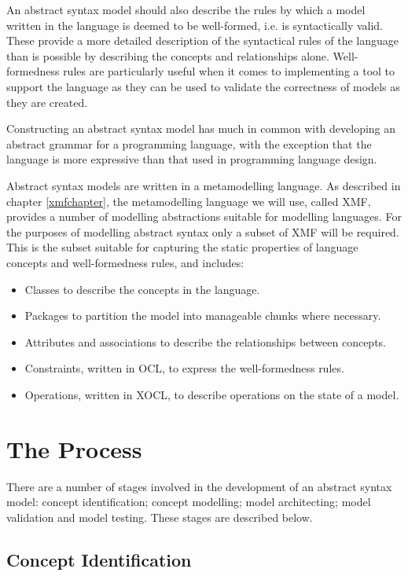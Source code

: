 An abstract syntax model should also describe  the rules by which
a model written in the language is deemed to be well-formed, i.e.
is syntactically valid. These provide a more detailed description
of the syntactical rules of the language than is possible by
describing the concepts and relationships alone. Well-formedness
rules are particularly useful when it comes to implementing a tool
to support the language as they can be used to validate the
correctness of models as they are created.

Constructing an abstract syntax model has much in common with
developing an abstract grammar for a programming language, with
the exception that the language is more expressive than that used
in programming language design.

Abstract syntax models are written in a metamodelling language. As
described in chapter \ref{xmfchapter}, the metamodelling language
we will use, called XMF, provides a number of modelling
abstractions suitable for modelling languages. For the purposes of
modelling abstract syntax only a subset of XMF will be required.
This is the subset suitable for capturing the static properties of
language concepts and well-formedness rules, and includes:

\begin{itemize}
\item Classes to describe the concepts in the language.
\item Packages to partition the model into manageable chunks where
necessary.
\item Attributes and associations to describe the relationships between
concepts.
\item Constraints, written in OCL, to express the well-formedness rules.
\item Operations, written in XOCL, to describe operations on the
state of a model.
\end{itemize}

\section{The Process}

There are a number of stages involved in the development of an
abstract syntax model: concept identification; concept modelling;
model architecting; model validation and model testing. These
stages are described below.

\subsection{Concept Identification}
\label{conceptidentification}

